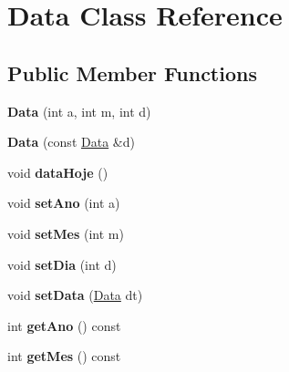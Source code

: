 \hypertarget{class_data}{\section{Data Class Reference}
\label{class_data}
}
\subsection*{Public Member Functions}
\begin{DoxyCompactItemize}
\item 
\hypertarget{class_data_af070d89007b1c6f4d80564b41f76716e}{{\bfseries Data} (int a, int m, int d)}\label{class_data_af070d89007b1c6f4d80564b41f76716e}

\item 
\hypertarget{class_data_a0a01507764ee49513a60e5ab4a859047}{{\bfseries Data} (const \hyperlink{class_data}{Data} \&d)}\label{class_data_a0a01507764ee49513a60e5ab4a859047}

\item 
\hypertarget{class_data_a5f9b98ce7fa2ad2387e266fa443d2d1d}{void {\bfseries data\-Hoje} ()}\label{class_data_a5f9b98ce7fa2ad2387e266fa443d2d1d}

\item 
\hypertarget{class_data_a7c9f3d851271bdf14177ee82aa88dbf9}{void {\bfseries set\-Ano} (int a)}\label{class_data_a7c9f3d851271bdf14177ee82aa88dbf9}

\item 
\hypertarget{class_data_a6d6c3b08044309c9f393af670494b6cc}{void {\bfseries set\-Mes} (int m)}\label{class_data_a6d6c3b08044309c9f393af670494b6cc}

\item 
\hypertarget{class_data_a341e8531d42262fb73c8956e7f9863f7}{void {\bfseries set\-Dia} (int d)}\label{class_data_a341e8531d42262fb73c8956e7f9863f7}

\item 
\hypertarget{class_data_a11e877be1cd73366bf8566ca31921822}{void {\bfseries set\-Data} (\hyperlink{class_data}{Data} dt)}\label{class_data_a11e877be1cd73366bf8566ca31921822}

\item 
\hypertarget{class_data_ad3981013cc47680fc4619063b7df4375}{int {\bfseries get\-Ano} () const }\label{class_data_ad3981013cc47680fc4619063b7df4375}

\item 
\hypertarget{class_data_af73ca438bf53a0f386a6b1c03a6c0d3e}{int {\bfseries get\-Mes} () const }\label{class_data_af73ca438bf53a0f386a6b1c03a6c0d3e}


\end{DoxyCompactItemize}
